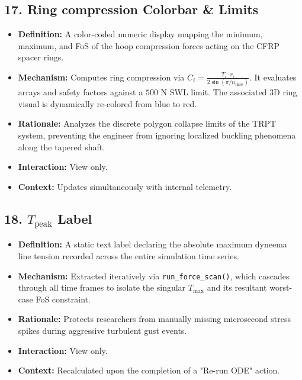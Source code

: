 \documentclass[11pt,a4paper]{article}
\begin{document}
\subsection{17. Ring compression Colorbar \& Limits}
\begin{itemize}
    \item \textbf{Definition:} A color-coded numeric display mapping the minimum, maximum, and FoS of the hoop compression forces acting on the CFRP spacer rings.
    \item \textbf{Mechanism:} Computes ring compression via $C_i = \frac{T_i \cdot r_i}{2 \sin(\pi / n_{\text{lines}})}$. It evaluates arrays and safety factors against a $500$ N SWL limit. The associated 3D ring visual is dynamically re-colored from blue to red.
    \item \textbf{Rationale:} Analyzes the discrete polygon collapse limits of the TRPT system, preventing the engineer from ignoring localized buckling phenomena along the tapered shaft.
    \item \textbf{Interaction:} View only.
    \item \textbf{Context:} Updates simultaneously with internal telemetry.
\end{itemize}

\subsection{18. $T_{\text{peak}}$ Label}
\begin{itemize}
    \item \textbf{Definition:} A static text label declaring the absolute maximum dyneema line tension recorded across the entire simulation time series.
    \item \textbf{Mechanism:} Extracted iteratively via \texttt{run\_force\_scan()}, which cascades through all time frames to isolate the singular $T_{\text{max}}$ and its resultant worst-case FoS constraint.
    \item \textbf{Rationale:} Protects researchers from manually missing microsecond stress spikes during aggressive turbulent gust events.
    \item \textbf{Interaction:} View only.
    \item \textbf{Context:} Recalculated upon the completion of a "Re-run ODE" action.
\end{itemize}
\end{document}
